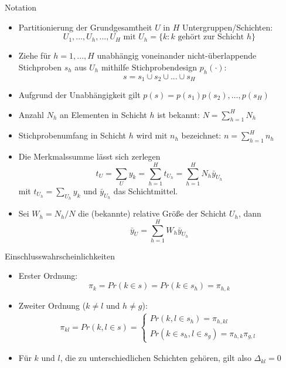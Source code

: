 \documentclass[9pt]{beamer}
\begin{document}
\begin{frame}{Notation}
\begin{itemize}
	\item Partitionierung der Grundgesamtheit $U$ in $H$ Untergruppen/Schichten: $$U_1,...,U_h,...,U_H \text{ mit } U_h = \{k: k \text{ gehört zur Schicht }h \}$$
	\item Ziehe für $h=1,...,H$ unabhängig voneinander nicht-überlappende Stichproben $s_h$ aus $U_h$ mithilfe Stichprobendesign $p_h(\cdot)$:
	$$s = s_1 \cup s_2 \cup ... \cup s_H$$
	\item Aufgrund der Unabhängigkeit gilt $p(s)=p(s_1)p(s_2),\dots,p(s_H)$
	\item Anzahl $N_h$ an Elementen in Schicht $h$ ist bekannt: $N = \sum_{h=1}^{H}N_h$
	\item Stichprobenumfang in Schicht $h$ wird mit $n_h$ bezeichnet: $n = \sum_{h=1}^{H}n_h$
	\item Die Merkmalssumme lässt sich zerlegen
	$$t_U = \sum_U y_k = \sum_{h=1}^{H}t_{U_h} = \sum_{h=1}^H N_h \bar{y}_{U_h}$$ mit $t_{U_h}=\sum_{U_h} y_k$ und $\bar{y}_{U_h}$ das Schichtmittel.
	\item Sei $W_h=N_h/N$ die (bekannte) relative Größe der Schicht $U_h$, dann
	$$\bar{y}_{U}=\sum_{h=1}^H W_h \bar{y}_{U_h}$$
\end{itemize}
\end{frame}

\begin{frame}{Einschlusswahrscheinlichkeiten}
\begin{itemize}
 	\item Erster Ordnung: $$\pi_k = Pr(k \in s) = Pr(k \in s_h)=\pi_{h,k}$$
 	\item Zweiter Ordnung ($k\neq l$ und $h\neq g$):
	\begin{align*}
	\pi_{kl} = Pr(k,l \in s) = 
	\begin{cases}
	Pr(k,l \in s_{h}) = \pi_{h,kl}\\
	Pr(k \in s_{h}, l \in s_{g}) = \pi_{h,k} \pi_{g,l}
	\end{cases}
	\end{align*}
	\item Für $k$ und $l$, die zu unterschiedlichen Schichten gehören, gilt also $\Delta_{kl}=0$
 	\end{itemize}
\end{frame}
\end{document}
